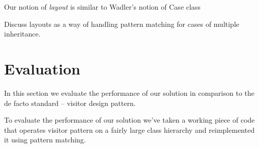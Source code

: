 \documentclass[preprint]{sigplanconf}
\begin{document}


Our notion of \emph{layout} is similar to Wadler's notion of Case class\cite{}

Discuss layouts as a way of handling pattern matching for cases of multiple 
inheritance.


\section{Evaluation} %
\label{sec:ev}

In this section we evaluate the performance of our solution in comparison to the 
de facto standard -- visitor design pattern.

To evaluate the performance of our solution we've taken a working piece of code 
that operates visitor pattern on a fairly large class hierarchy and 
reimplemented it using pattern matching.
\end{document}
